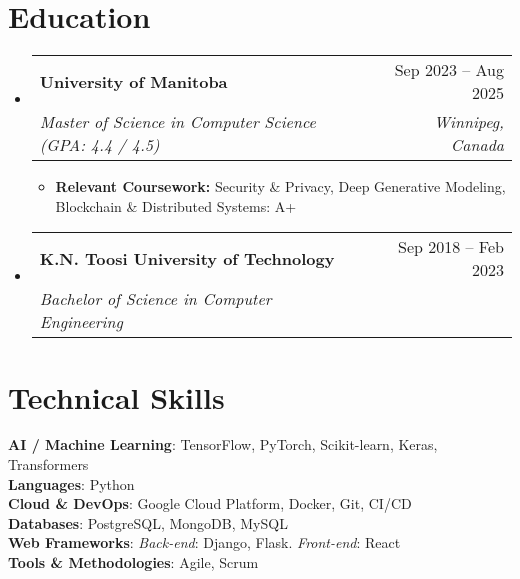 \documentclass[letterpaper,11pt]{article}
\makeatletter
\newcommand{\resumeItem}[1]{
  \item\small{
    #1 \vspace{0pt}
  }
}
\newcommand{\resumeSubheading}[4]{
  \vspace{-2pt}\item
    \begin{tabular*}{0.97\textwidth}[t]{l@{\extracolsep{\fill}}r}
      \textbf{#1} & #2 \\
      \textit{\small#3} & \textit{\small #4} \\
    \end{tabular*}\vspace{-3pt}
}
\newcommand{\resumeSubHeadingListStart}{\begin{itemize}[leftmargin=0.15in, label={}]}
\newcommand{\resumeSubHeadingListEnd}{\end{itemize}}
\newcommand{\resumeItemListStart}{\begin{itemize}}
\newcommand{\resumeItemListEnd}{\end{itemize}\vspace{-5pt}}
\makeatother
\begin{document}
\section{Education}
    \resumeSubHeadingListStart

    \resumeSubheading
    {University of Manitoba}{Sep 2023 – Aug 2025}
    {Master of Science in Computer Science (GPA: 4.4 / 4.5)}{Winnipeg, Canada}
    \resumeItemListStart
        \resumeItem{\textbf{Relevant Coursework:}  Security \& Privacy, Deep Generative Modeling, Blockchain \& Distributed Systems: A+}
    \resumeItemListEnd

    \resumeSubheading
    {K.N. Toosi University of Technology}{Sep 2018 – Feb 2023}
    {Bachelor of Science in Computer Engineering}{}

    \resumeSubHeadingListEnd

\section{Technical Skills}

\begin{itemize}[leftmargin=0.15in, label={}]
\small{\item{
    \textbf{AI / Machine Learning}{: TensorFlow, PyTorch, Scikit-learn, Keras, Transformers} \\
    \textbf{Languages}{: Python} \\
    \textbf{Cloud \& DevOps}{: Google Cloud Platform, Docker, Git, CI/CD} \\
    \textbf{Databases}{: PostgreSQL, MongoDB, MySQL} \\
    \textbf{Web Frameworks}{: \emph{Back-end}: Django, Flask. \emph{Front-end}: React} \\
    \textbf{Tools \& Methodologies}{: Agile, Scrum}
}}
\end{itemize}

\end{document}
